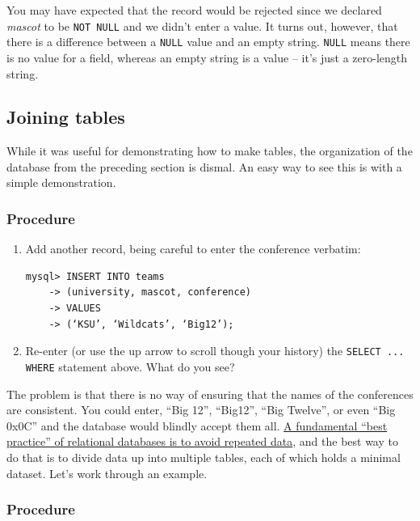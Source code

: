\documentclass[11pt]{article} %
\begin{document}
You may have expected that the record would be rejected since we declared \emph{mascot} to be \verb|NOT NULL| and we didn’t enter a value. It turns out, however, that there is a difference between a \verb|NULL| value and an empty string. \verb|NULL| means there is no value for a field, whereas an empty string is a value -- it’s just a zero-length string.

\subsection*{Joining tables}
\label{sec:sql.joins}
While it was useful for demonstrating how to make tables, the organization of the database from the preceding section is dismal. An easy way to see this is with a simple demonstration.

\subsubsection*{Procedure}

\begin{enumerate}
\item Add another record, being careful to enter the conference verbatim:

\begin{verbatim}
mysql> INSERT INTO teams
    -> (university, mascot, conference)
    -> VALUES
    -> (‘KSU’, ‘Wildcats’, ‘Big12’);
\end{verbatim}

\item Re-enter (or use the up arrow to scroll though your history) the \verb|SELECT ... WHERE| statement above. What do you see?

\end{enumerate}

The problem is that there is no way of ensuring that the names of the conferences are consistent. You could enter, “Big 12”, “Big12”, “Big Twelve”, or even “Big 0x0C” and the database would blindly accept them all. \underline{A fundamental “best practice” of relational databases is to avoid repeated data}, and the best way to do that is to divide data up into multiple tables, each of which holds a minimal dataset. Let’s work through an example.

\subsubsection*{Procedure}
\end{document}
